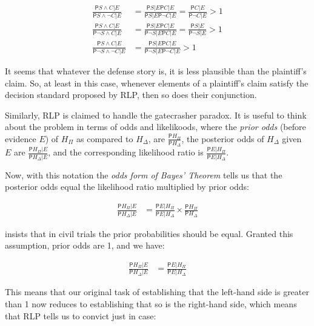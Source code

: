 \documentclass[10pt,dvipsnames,enabledeprecatedfontcommands]{scrartcl}
\newcommand{\n}{\neg}
\newcommand{\et}{\wedge}
\newcommand{\pr}{\mathsf{P}}
\begin{document}
\begin{align}\label{eq:cheng-multiplication}
\frac{\pr{S\et C\vert E}}{\pr{S\et \n C\vert E}} & = \frac{\pr{S\vert E}\pr{C\vert E}}{\pr{S \vert E}\pr{\n C \vert E}}  =\frac{\pr{C\vert E}}{\pr{\n C \vert E}} > 1 \\
\nonumber
\frac{\pr{S\et C\vert E}}{\pr{\n S\et C\vert E}} & = \frac{\pr{S\vert E}\pr{C\vert E}}{\pr{\n S \vert E}\pr{C\vert E}}  = \frac{\pr{S\vert E}}{\pr{\n S \vert E}} > 1 \\
\nonumber
\frac{\pr{S\et C\vert E}}{\pr{\n S\et \n C\vert E}} & = \frac{\pr{S\vert E}\pr{C\vert E}}{\pr{\n S \vert E}\pr{\n C \vert E}}   > 1 
\end{align}

\noindent It seems that whatever the defense story is, it is less
plausible than the plaintiff's claim. So, at least in this case,
whenever elements of a plaintiff's claim satisfy the decision standard
proposed by RLP, then so does their conjunction.

Similarly, RLP is claimed to handle the gatecrasher paradox. It is
useful to think about the problem in terms of odds and likelikoods,
where the \emph{prior odds} (before evidence \(E\)) of \(H_\Pi\) as
compared to \(H_\Delta\), are \(\frac{\pr{H_\Pi}}{\pr{H_\Delta}}\), the
posterior odds of \(H_\Delta\) given \(E\) are
\(\frac{\pr{H_\Pi \vert E}}{\pr{H_\Delta \vert E}}\), and the
corresponding likelihood ratio is
\(\frac{\pr{E\vert H_\Pi}}{\pr{E\vert H_\Delta}}\).

Now, with this notation the \emph{odds form of Bayes' Theorem} tells us
that the posterior odds equal the likelihood ratio multiplied by prior
odds:

\begin{align*}
\frac{\pr{H_\Pi \vert E}}{\pr{H_\Delta \vert E}} & = 
\frac{\pr{E\vert H_\Pi}}{\pr{E\vert H_\Delta}} 
\times \frac{\pr{H_\Pi}}{\pr{H_\Delta}}
 \end{align*}

 insists that in civil
trials the prior probabilities should be equal. Granted this assumption,
prior odds are 1, and we have:

\begin{align}\label{eq:cheng_simple_odds}
\frac{\pr{H_\Pi \vert E}}{\pr{H_\Delta \vert E}} & = 
\frac{\pr{E\vert H_\Pi}}{\pr{E\vert H_\Delta}} 
 \end{align}

This means that our original task of establishing that the left-hand
side is greater than 1 now reduces to establishing that so is the
right-hand side, which means that RLP tells us to convict just in case:
\end{document}
